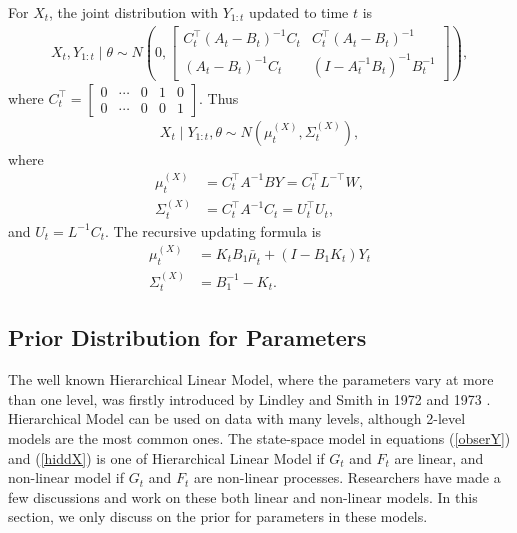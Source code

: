 For $X_{t}$, the joint distribution with $Y_{1:t}$ updated to time $t$ is 
\begin{align*}
X_{t}, Y_{1:t} \mid \theta \sim N\left( 0, \begin{bmatrix}
C_{t}^\top(A_{t}-B_{t}) ^{-1}C_{t} & C_{t}^\top (A_{t}-B_{t})^{-1}\\
(A_{t}-B_{t})^{-1}C_{t} & (I- A_{t}^{-1}B_{t}) ^{-1}B_{t}^{-1}
\end{bmatrix} \right),
\end{align*}
where $C_{t}^\top=\begin{bmatrix}
0 & \cdots & 0 & 1 & 0 \\ 0 & \cdots & 0 & 0 & 1 
\end{bmatrix}$. Thus 
\begin{align*}
X_{t}\mid Y_{1:t},\theta \sim N(\mu_{t}^{(X)},\Sigma_{t}^{(X)}),
\end{align*}
where
\begin{align*}
\mu_{t}^{(X)} & = C_{t}^\top A^{-1}BY =C_{t}^\top L^{-\top}W,\\
\Sigma_{t}^{(X)} & =C_{t}^\top A^{-1}C_{t} =U_{t}^\top U_{t},
\end{align*}
and $U_{t} = L^{-1} C_{t}$.
The recursive updating formula is  
\begin{align}
\mu_{t}^{(X)}  &=  K_{t}B_1\bar{\mu}_{t} + (I - B_1K_{t})Y_{t}  \\
\Sigma_{t}^{(X)}  &=B_1^{-1}-K_{t}.
\end{align}





\subsection{Prior Distribution for Parameters}

The well known Hierarchical Linear Model, where the parameters vary at more than one level, was firstly introduced by Lindley and Smith in 1972 and 1973 \cite{lindley1972bayes} \cite{smith1973general}. Hierarchical Model can be used on data with many levels, although 2-level models are the most common ones. The state-space model in equations (\ref{obserY}) and (\ref{hiddX}) is one of Hierarchical Linear Model if $G_t$ and $F_t$ are linear, and non-linear model if $G_t$ and $F_t$ are non-linear processes. Researchers have made a few discussions and work on these both linear and non-linear models. In this section, we only discuss on the prior for parameters in these models. 

